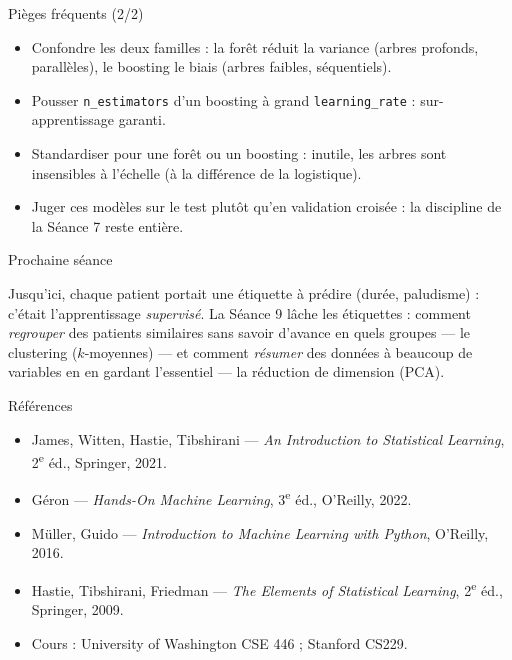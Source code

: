 \documentclass[aspectratio=169,11pt]{beamer}
\begin{document}
\begin{frame}{Pièges fréquents (2/2)}
\begin{itemize}\small
  \item Confondre les deux familles : la forêt réduit la variance (arbres profonds, parallèles), le boosting le biais (arbres faibles, séquentiels).
  \item Pousser \texttt{n\_estimators} d'un boosting à grand \texttt{learning\_rate} : sur-apprentissage garanti.
  \item Standardiser pour une forêt ou un boosting : inutile, les arbres sont insensibles à l'échelle (à la différence de la logistique).
  \item Juger ces modèles sur le test plutôt qu'en validation croisée : la discipline de la Séance 7 reste entière.
\end{itemize}
\end{frame}

\begin{frame}{Prochaine séance}
\begin{ucadfront}
{\small Jusqu'ici, chaque patient portait une étiquette à prédire (durée, paludisme) : c'était l'apprentissage \emph{supervisé}. La Séance 9 lâche les étiquettes : comment \emph{regrouper} des patients similaires sans savoir d'avance en quels groupes — le clustering ($k$-moyennes) — et comment \emph{résumer} des données à beaucoup de variables en en gardant l'essentiel — la réduction de dimension (PCA).}
\end{ucadfront}
\end{frame}

\begin{frame}{Références}
\begin{itemize}\small
  \item James, Witten, Hastie, Tibshirani — \emph{An Introduction to Statistical Learning}, 2\textsuperscript{e} éd., Springer, 2021.
  \item Géron — \emph{Hands-On Machine Learning}, 3\textsuperscript{e} éd., O'Reilly, 2022.
  \item Müller, Guido — \emph{Introduction to Machine Learning with Python}, O'Reilly, 2016.
  \item Hastie, Tibshirani, Friedman — \emph{The Elements of Statistical Learning}, 2\textsuperscript{e} éd., Springer, 2009.
  \item Cours : University of Washington CSE 446 ; Stanford CS229.
\end{itemize}
\end{frame}
\end{document}
